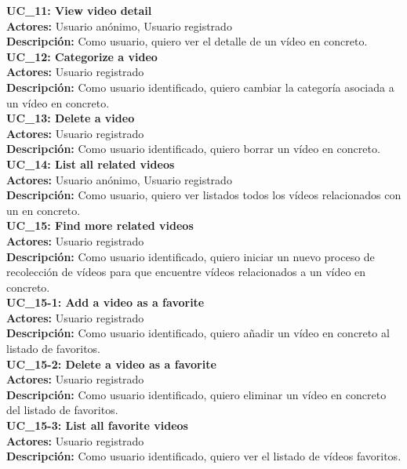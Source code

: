\documentclass[11pt,a4paper]{article}
\begin{document}
\noindent\textbf{UC\_11: View video detail}\\
\textbf{Actores:} Usuario anónimo, Usuario registrado\\
\textbf{Descripción:} Como usuario, quiero ver el detalle de un vídeo en concreto.
\\

\noindent\textbf{UC\_12: Categorize a video}\\
\textbf{Actores:} Usuario registrado\\
\textbf{Descripción:} Como usuario identificado, quiero cambiar la categoría asociada a un vídeo en concreto.
\\

\noindent\textbf{UC\_13: Delete a video}\\
\textbf{Actores:} Usuario registrado\\
\textbf{Descripción:} Como usuario identificado, quiero borrar un vídeo en concreto.
\\

\noindent\textbf{UC\_14: List all related videos}\\
\textbf{Actores:} Usuario anónimo, Usuario registrado\\
\textbf{Descripción:} Como usuario, quiero ver listados todos los vídeos relacionados con un  en concreto.
\\

\noindent\textbf{UC\_15: Find more related videos}\\
\textbf{Actores:} Usuario registrado\\
\textbf{Descripción:} Como usuario identificado, quiero iniciar un nuevo proceso de recolección de vídeos para que encuentre vídeos relacionados a un vídeo en concreto.
\\

\noindent\textbf{UC\_15-1: Add a video as a favorite}\\
\textbf{Actores:} Usuario registrado\\
\textbf{Descripción:} Como usuario identificado, quiero añadir un vídeo en concreto al listado de favoritos.
\\

\noindent\textbf{UC\_15-2: Delete a video as a favorite}\\
\textbf{Actores:} Usuario registrado\\
\textbf{Descripción:} Como usuario identificado, quiero eliminar un vídeo en concreto del listado de favoritos.
\\

\noindent\textbf{UC\_15-3: List all favorite videos}\\
\textbf{Actores:} Usuario registrado\\
\textbf{Descripción:} Como usuario identificado, quiero ver el listado de vídeos favoritos.
\\
\end{document}
